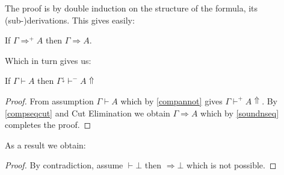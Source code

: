 The proof is by double induction on the structure of the formula, its (sub-)derivations. This gives easily:
\begin{theorem}
	If $\Gamma\Rightarrow^{+}A$ then $\Gamma\Rightarrow A$.
	
\end{theorem}
Which in turn gives us:
\begin{theorem}
	\label{normalization}
	If $\Gamma\vdash A$ then $\Gamma^{\downarrow}\vdash^{-} A\Uparrow$
\end{theorem}
\begin{proof}
	From assumption $\Gamma \vdash A$ which by \ref{compannot} gives $\Gamma\vdash^{+} A\Uparrow$. By \ref{compseqcut} and Cut  Elimination we obtain $\Gamma\Rightarrow A$ which by  \ref{soundnseq} completes the proof.
\end{proof}
As a result we obtain:
\begin{proof}
	By contradiction, assume $\vdash\bot$ then $\Rightarrow \bot$ which is not possible.
\end{proof}